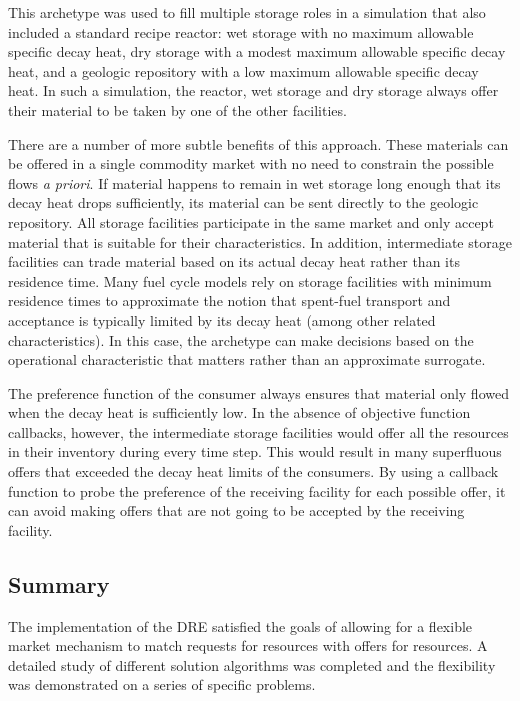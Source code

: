 This archetype was used to fill multiple storage roles in a simulation that
also included a standard recipe reactor: wet storage with no maximum allowable
specific decay heat, dry storage with a modest maximum allowable specific
decay heat, and a geologic repository with a low maximum allowable specific
decay heat.  In such a simulation, the reactor, wet storage and dry storage
always offer their material to be taken by one of the other facilities.

There are a number of more subtle benefits of this approach.  These materials
can be offered in a single commodity market with no need to constrain the
possible flows \textit{a priori}.  If material happens to remain in wet
storage long enough that its decay heat drops sufficiently, its material can
be sent directly to the geologic repository.  All storage facilities
participate in the same market and only accept material that is suitable for
their characteristics.  In addition, intermediate storage facilities can trade
material based on its actual decay heat rather than its residence time.  Many
fuel cycle models rely on storage facilities with minimum residence times to
approximate the notion that spent-fuel transport and acceptance is typically
limited by its decay heat (among other related characteristics).  In this
case, the archetype can make decisions based on the operational characteristic
that matters rather than an approximate surrogate.

The preference function of the consumer always ensures that material only
flowed when the decay heat is sufficiently low.  In the absence of objective
function callbacks, however, the intermediate storage facilities would offer
all the resources in their inventory during every time step.  This would
result in many superfluous offers that exceeded the decay heat limits of the
consumers.  By using a callback function to probe the preference of the
receiving facility for each possible offer, it can avoid making offers that
are not going to be accepted by the receiving facility.

 
\subsection{Summary}

The implementation of the \gls{DRE} satisfied the goals of allowing for a
flexible market mechanism to match requests for resources with offers for
resources.  A detailed study of different solution algorithms was
completed and the flexibility was demonstrated on a
series of specific problems.
